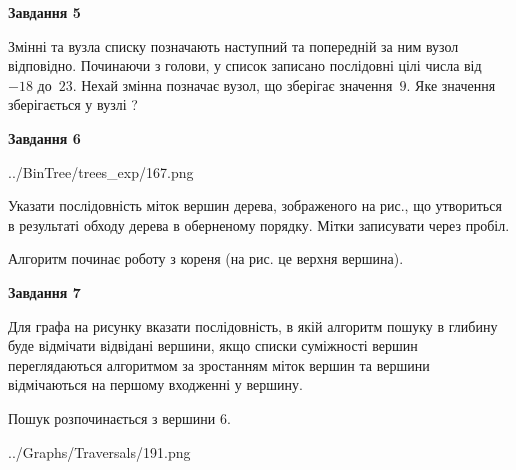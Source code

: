 \documentclass[12pt, ukrainian]{article}
\begin{document}
{\begin {large}
{\begin {center}\textbf{Завдання 5}\end {center}}\par
Змінні  та  вузла списку позначають наступний та попередній за ним вузол відповідно. Починаючи з голови, у список записано послідовні цілі числа від~$-18$ до~$23$. Нехай змінна  позначає вузол, що зберігає значення~$9$.
Яке значення зберігається у вузлі  ?\par
\newpage

{\begin {center}\textbf{Завдання 6}\end {center}}\par

\begin{center}
	{../BinTree/trees_exp/167.png}
\end{center}
Указати послідовність міток вершин дерева, зображеного на рис., що утвориться в результаті обходу дерева в оберненому порядку. Мітки записувати через пробіл.\par Алгоритм починає роботу з кореня (на рис. це верхня вершина).\par
\newpage

{\begin {center}\textbf{Завдання 7}\end {center}}\par
Для графа на рисунку вказати послідовність, в якій алгоритм пошуку в глибину буде відмічати відвідані вершини, якщо списки суміжності вершин переглядаються алгоритмом за зростанням міток вершин та вершини відмічаються на першому вход\-женні у вершину.\par
Пошук розпочинається з вершини 6.\par

\begin{center}
	{../Graphs/Traversals/191.png}
\end{center}\par
\newpage


\end{large}}
\end{document}
